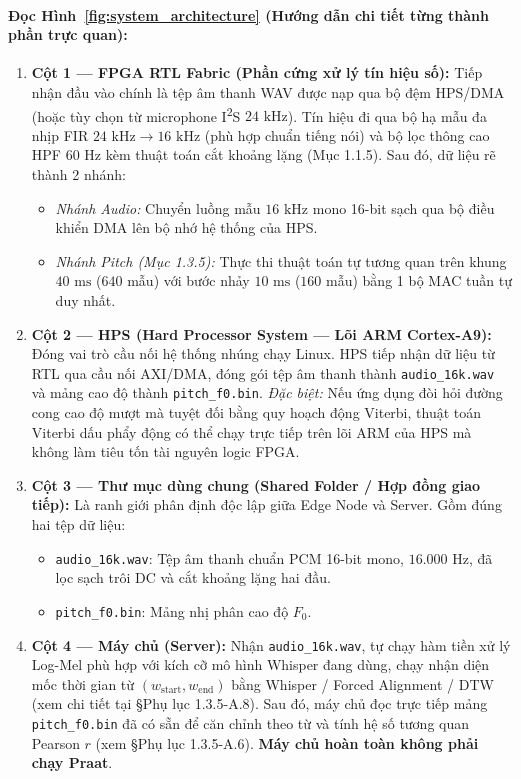 \documentclass[11pt,a4paper]{article}
\begin{document}
\paragraph{Đọc Hình~\ref{fig:system_architecture} (Hướng dẫn chi tiết từng thành phần trực quan):}
\begin{enumerate}
    \setlength{\itemsep}{1.5pt}
    \item \textbf{Cột 1 --- FPGA RTL Fabric (Phần cứng xử lý tín hiệu số):} Tiếp nhận đầu vào chính là tệp âm thanh WAV được nạp qua bộ đệm HPS/DMA (hoặc tùy chọn từ microphone I\textsuperscript{2}S $24\text{ kHz}$). Tín hiệu đi qua bộ hạ mẫu đa nhịp FIR $24\text{ kHz} \to 16\text{ kHz}$ (phù hợp chuẩn tiếng nói) và bộ lọc thông cao HPF $60\text{ Hz}$ kèm thuật toán cắt khoảng lặng (Mục 1.1.5). Sau đó, dữ liệu rẽ thành 2 nhánh:
    \begin{itemize}
        \item \emph{Nhánh Audio:} Chuyển luồng mẫu $16\text{ kHz}$ mono 16-bit sạch qua bộ điều khiển DMA lên bộ nhớ hệ thống của HPS.
        \item \emph{Nhánh Pitch (Mục 1.3.5):} Thực thi thuật toán tự tương quan trên khung $40\text{ ms}$ ($640$ mẫu) với bước nhảy $10\text{ ms}$ ($160$ mẫu) bằng 1 bộ MAC tuần tự duy nhất.
    \end{itemize}
    \item \textbf{Cột 2 --- HPS (Hard Processor System --- Lõi ARM Cortex-A9):} Đóng vai trò cầu nối hệ thống nhúng chạy Linux. HPS tiếp nhận dữ liệu từ RTL qua cầu nối AXI/DMA, đóng gói tệp âm thanh thành \texttt{audio\_16k.wav} và mảng cao độ thành \texttt{pitch\_f0.bin}. \emph{Đặc biệt:} Nếu ứng dụng đòi hỏi đường cong cao độ mượt mà tuyệt đối bằng quy hoạch động Viterbi, thuật toán Viterbi dấu phẩy động có thể chạy trực tiếp trên lõi ARM của HPS mà không làm tiêu tốn tài nguyên logic FPGA.
    \item \textbf{Cột 3 --- Thư mục dùng chung (Shared Folder / Hợp đồng giao tiếp):} Là ranh giới phân định độc lập giữa Edge Node và Server. Gồm đúng hai tệp dữ liệu:
    \begin{itemize}
        \item \texttt{audio\_16k.wav}: Tệp âm thanh chuẩn PCM 16-bit mono, $16.000\text{ Hz}$, đã lọc sạch trôi DC và cắt khoảng lặng hai đầu.
        \item \texttt{pitch\_f0.bin}: Mảng nhị phân cao độ $F_0$.
    \end{itemize}
    \item \textbf{Cột 4 --- Máy chủ (Server):} Nhận \texttt{audio\_16k.wav}, tự chạy hàm tiền xử lý Log-Mel phù hợp với kích cỡ mô hình Whisper đang dùng, chạy nhận diện mốc thời gian từ $(w_{\text{start}}, w_{\text{end}})$ bằng Whisper / Forced Alignment / DTW (xem chi tiết tại §Phụ lục 1.3.5-A.8). Sau đó, máy chủ đọc trực tiếp mảng \texttt{pitch\_f0.bin} đã có sẵn để căn chỉnh theo từ và tính hệ số tương quan Pearson $r$ (xem §Phụ lục 1.3.5-A.6). \textbf{Máy chủ hoàn toàn không phải chạy Praat}.
\end{enumerate}
\end{document}
